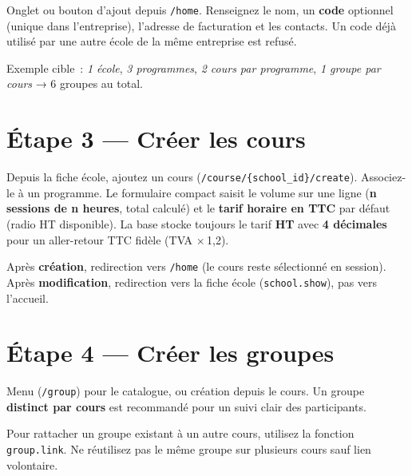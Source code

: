 \begin{workflowstep}[École]
  Onglet  ou bouton d'ajout depuis \texttt{/home}. Renseignez le nom, un \textbf{code} optionnel (unique dans l'entreprise), l'adresse de facturation et les contacts. Un code déjà utilisé par une autre école de la même entreprise est refusé.
\end{workflowstep}

Exemple cible~: \emph{1 école}, \emph{3 programmes}, \emph{2 cours par programme}, \emph{1 groupe par cours} → 6 groupes au total.

\section{Étape 3 — Créer les cours}

\begin{workflowstep}[Cours]
  Depuis la fiche école, ajoutez un cours (\texttt{/course/\{school\_id\}/create}). Associez-le à un programme. Le formulaire compact saisit le volume sur une ligne (\textbf{n sessions de n heures}, total calculé) et le \textbf{tarif horaire en TTC} par défaut (radio HT disponible). La base stocke toujours le tarif \textbf{HT} avec \textbf{4 décimales} pour un aller-retour TTC fidèle (TVA ×\,1{,}2).
\end{workflowstep}

Après \textbf{création}, redirection vers \texttt{/home} (le cours reste sélectionné en session). Après \textbf{modification}, redirection vers la fiche école (\texttt{school.show}), pas vers l'accueil.

\section{Étape 4 — Créer les groupes}

\begin{workflowstep}[Groupes]
  Menu  (\texttt{/group}) pour le catalogue, ou création depuis le cours. Un groupe \textbf{distinct par cours} est recommandé pour un suivi clair des participants.
\end{workflowstep}


\begin{astuce}
  Pour rattacher un groupe existant à un autre cours, utilisez la fonction \texttt{group.link}. Ne réutilisez pas le même groupe sur plusieurs cours sauf lien volontaire.
\end{astuce}

